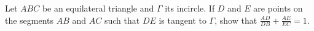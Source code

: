 Let $ABC$ be an equilateral triangle and $\Gamma$ its incircle. If $D$ and $E$ are points on the segments $AB$ and $AC$ such that $DE$ is tangent to $\Gamma$,  show that $\frac{AD}{DB}+\frac{AE}{EC}=1$.